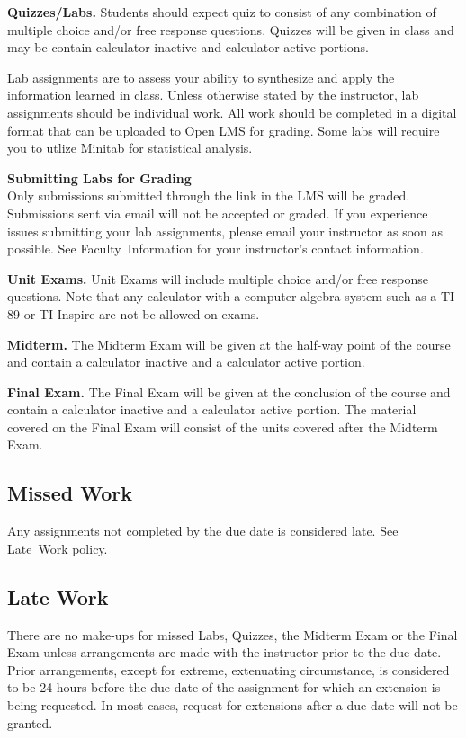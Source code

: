 \documentclass{article}
\renewenvironment{framed}[1][]{%
  \def\FrameCommand{%
    \hspace{1pt}%
    {\color{mybordercolor}\vrule width 2pt} %
    \hspace{1pt}%
    \fboxsep=\FrameSep%
    \colorbox{mybgcolor}%
  }%
  \MakeFramed {\advance\hsize-\width \FrameRestore}%
}{%
  \endMakeFramed
}
\begin{document}
\textbf{Quizzes/Labs.} Students should expect quiz to consist of any combination of multiple choice and/or free response questions. Quizzes will be given in class and may be contain calculator inactive and calculator active portions.

Lab assignments are to assess your ability to synthesize and apply the information learned in class. Unless otherwise stated by the instructor, lab assignments should be individual work. All work should be completed in a digital format that can be uploaded to Open LMS for grading. Some labs will require you to utlize Minitab for statistical analysis.

\begin{framed}
\textbf{Submitting Labs for Grading}\\
Only submissions submitted through the link in the LMS will be graded. Submissions sent via email will not be accepted or graded. If you experience issues submitting your lab assignments, please email your instructor as soon as possible. See Faculty~Information for your instructor's contact information.
\end{framed}

\textbf{Unit Exams.} Unit Exams will include multiple choice and/or free response questions. Note that any calculator with a computer algebra system such as a TI-89 or TI-Inspire are not be allowed on exams.

\textbf{Midterm.} The Midterm Exam will be given at the half-way point of the course and contain a calculator inactive and a calculator active portion.

\textbf{Final Exam.} The Final Exam will be given at the conclusion of the course and contain a calculator inactive and a calculator active portion. The material covered on the Final Exam will consist of the units covered after the Midterm Exam.

\subsection{Missed Work}

Any assignments not completed by the due date is considered late. See Late~Work policy.

\subsection{Late Work}\label{late-work}

There are no make-ups for missed Labs, Quizzes, the Midterm Exam or the Final Exam unless arrangements are made with the instructor prior to the due date. Prior arrangements, except for extreme, extenuating circumstance, is considered to be 24 hours before the due date of the assignment for which an extension is being requested. In most cases, request for extensions after a due date will not be granted.
\end{document}
